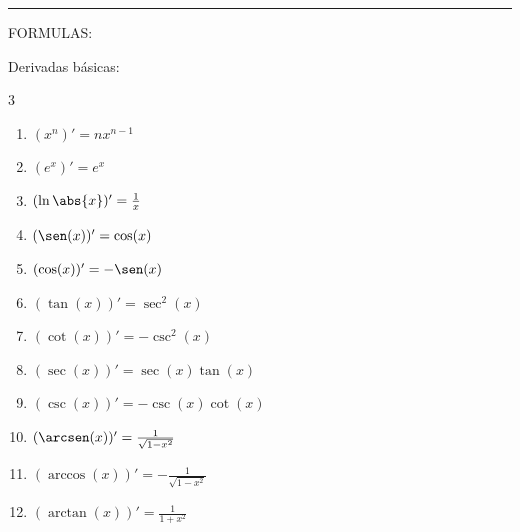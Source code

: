 \documentclass{article}
\begin{document}
\noindent\rule[0mm]{175mm}{.1mm}

\vspace{1mm}
{\large FORMULAS:}
\vspace{3mm}

Derivadas básicas:
\begin{multicols}{3}
  \begin{enumerate}
    \item $(x^n)' = nx^{n-1}$
    \item $(e^x)' = e^x$
    \item $(\ln\abs{x})' = \frac{1}{x}$
    \item $(\sen(x))' = \cos(x)$
    \item $(\cos(x))' = -\sen(x)$
    \item $(\tan(x))' = \sec^2(x)$
    \item $(\cot(x))' = -\csc^2(x)$
    \item $(\sec(x))' = \sec(x)\tan(x)$
    \item $(\csc(x))' = -\csc(x)\cot(x)$
    \item $(\arcsen(x))' = \frac{1}{\sqrt{1-x^2}}$
    \item $(\arccos(x))' = -\frac{1}{\sqrt{1-x^2}}$
    \item $(\arctan(x))' = \frac{1}{1+x^2}$
  \end{enumerate}
\end{multicols}
\vspace{2mm}

\end{document}
